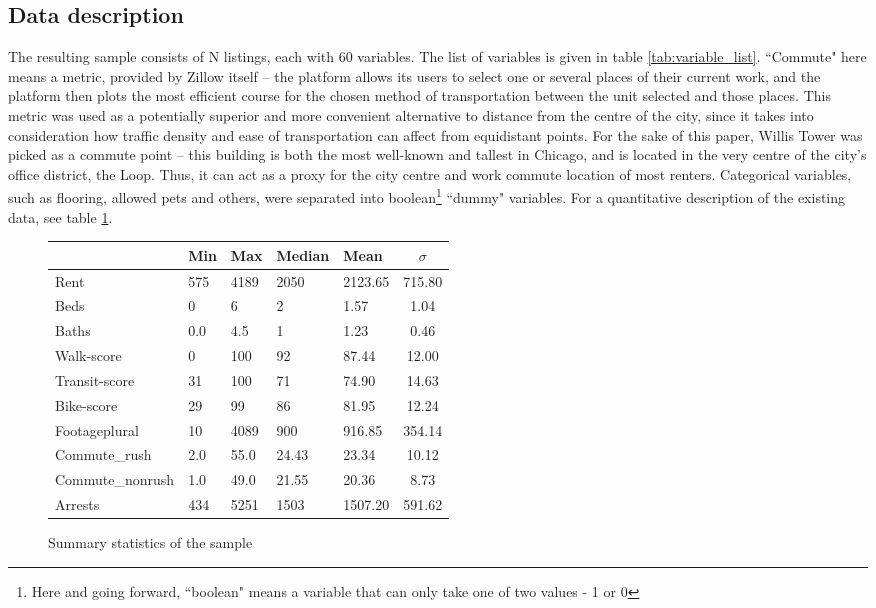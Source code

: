 \documentclass[12pt]{report}
\begin{document}
\subsection{Data description}

The resulting sample consists of N listings, each with 60 variables. The list of variables is given in table \ref{tab:variable_list}. ``Commute" here means a metric, provided by Zillow itself -- the platform allows its users to select one or several places of their current work, and the platform then plots the most efficient course for the chosen method of transportation between the unit selected and those places. This metric was used as a potentially superior and more convenient alternative to distance from the centre of the city, since it takes into consideration how traffic density and ease of transportation can affect from equidistant points. For the sake of this paper, Willis Tower was picked as a commute point -- this building is both the most well-known and tallest in Chicago, and is located in the very centre of the city's office district, the Loop. Thus, it can act as a proxy for the city centre and work commute location of most renters. Categorical variables, such as flooring, allowed pets and others, were separated into boolean\footnote{Here and going forward, ``boolean" means a variable that can only take one of two values - 1 or 0} ``dummy" variables. For a quantitative description of the existing data, see table \ref{tab:summary_statistics}.

\begin{figure}[ht]
	\centering
	\begin{tabular}{l l l l l S[table-format=3.2]}
		\hline
		                 & Min & Max  & Median & Mean    & $\sigma$ \\
		\hline
		Rent             & 575 & 4189 & 2050   & 2123.65 & 715.80   \\
		Beds             & 0   & 6    & 2      & 1.57    & 1.04     \\
		Baths            & 0.0 & 4.5  & 1      & 1.23    & 0.46     \\
		Walk-score       & 0   & 100  & 92     & 87.44   & 12.00    \\
		Transit-score    & 31  & 100  & 71     & 74.90   & 14.63    \\
		Bike-score       & 29  & 99   & 86     & 81.95   & 12.24    \\
		Footageplural    & 10  & 4089 & 900    & 916.85  & 354.14   \\
		Commute\_rush    & 2.0 & 55.0 & 24.43  & 23.34   & 10.12    \\
		Commute\_nonrush & 1.0 & 49.0 & 21.55  & 20.36   & 8.73     \\
		Arrests          & 434 & 5251 & 1503   & 1507.20 & 591.62   \\
		\hline
	\end{tabular}
	\caption{Summary statistics of the sample}
	\label{tab:summary_statistics}
\end{figure}
\end{document}
